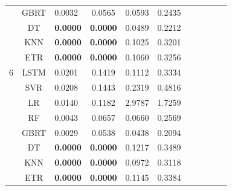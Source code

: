 {\begin{longtable}{cclcccccccc}
   & GBRT & 0.0032 & 0.0565 & 0.0593 & 0.2435  \\
   & DT & \textbf{0.0000} & \textbf{0.0000} & 0.0489 & 0.2212 \\
   & KNN & \textbf{0.0000} & \textbf{0.0000} & 0.1025 & 0.3201 \\
   & ETR & \textbf{0.0000} & \textbf{0.0000} & 0.1060 & 0.3256 \\
  \hline
  6 & LSTM & 0.0201 & 0.1419 & 0.1112 & 0.3334 \\
   & SVR & 0.0208 & 0.1443 & 0.2319 & 0.4816 \\
   & LR & 0.0140 & 0.1182 & 2.9787 & 1.7259 \\
   & RF & 0.0043 & 0.0657 & 0.0660 & 0.2569 \\
   & GBRT & 0.0029 & 0.0538 & 0.0438 & 0.2094 \\
   & DT & \textbf{0.0000} & \textbf{0.0000} & 0.1217 & 0.3489 \\
   & KNN & \textbf{0.0000} & \textbf{0.0000} & 0.0972 & 0.3118 \\
   & ETR & \textbf{0.0000} & \textbf{0.0000} & 0.1145 & 0.3384 \\
   \hline
\end{longtable}
}


